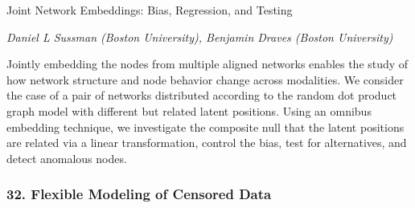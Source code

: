 \begin{itemize}
Joint Network Embeddings: Bias, Regression, and Testing

\emph{\footnotesize Daniel L Sussman (Boston University), Benjamin Draves (Boston University)}

Jointly embedding the nodes from multiple aligned networks enables the study of how network structure and node behavior change across modalities. We consider the case of a pair of networks distributed according to the random dot product graph model with different but related latent positions. Using an omnibus embedding technique, we investigate the composite null that the latent positions are related via a linear transformation, control the bias, test for alternatives, and detect anomalous nodes.

\end{itemize}

\subsubsection*{32. Flexible Modeling of Censored Data}


